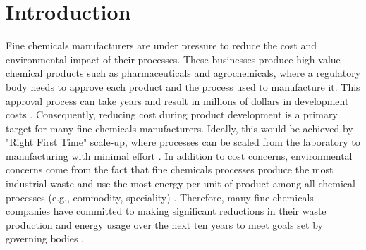 \chapter{Introduction}\label{ch:introduction}

Fine chemicals manufacturers are under pressure to reduce the cost and environmental impact of their processes. These businesses produce high value chemical products such as pharmaceuticals and agrochemicals, where a regulatory body needs to approve each product and the process used to manufacture it. This approval process can take years and result in millions of dollars in development costs \cite{Prasad2017}. Consequently, reducing cost during product development is a primary target for many fine chemicals manufacturers. Ideally, this would be achieved by "Right First Time" scale-up, where processes can be scaled from the laboratory to manufacturing with minimal effort \cite{Poechlauer2013}. In addition to cost concerns, environmental concerns come from the fact that fine chemicals processes produce the most industrial waste and use the most energy per unit of product among all chemical processes (e.g., commodity, speciality) \cite{Sheldon2018}. Therefore, many fine chemicals companies have committed to making significant reductions in their waste production and energy usage over the next ten years to meet goals set by governing bodies \cite{BASF2020}.


